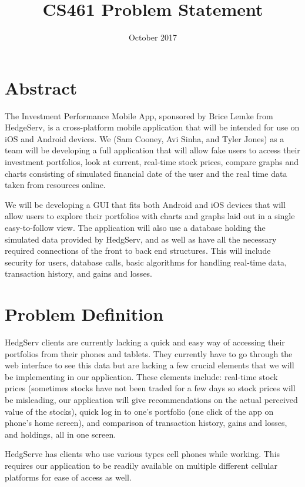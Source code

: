 \documentclass[letterpaper,10pt,titlepage]{article}
\title{CS461 Problem Statement}
\author{\name}
\date{October 2017}
\begin{document}
\begin{titlepage}
   \maketitle
\end{titlepage}

\section{Abstract}

The Investment Performance Mobile App, sponsored by Brice Lemke from HedgeServ,
is a cross-platform mobile application that will be intended for use on
iOS and Android devices. We (Sam Cooney, Avi Sinha, and Tyler Jones) as a 
team will be developing a full application that will allow fake users to
access their investment portfolios, look at current, real-time stock prices,
compare graphs and charts consisting of simulated financial date of the user
and the real time data taken from resources online. 

We will be developing a GUI that fits both Android and iOS devices that will
allow users to explore their portfolios with charts and graphs laid out in a
single easy-to-follow view. The application will also use a database holding the 
simulated data provided by HedgServ, and as well as have all the necessary 
required connections of the front to back end structures. This will include
security for users, database calls, basic algorithms for handling
real-time data, transaction history, and gains and losses.

\section{Problem Definition}

HedgServ clients are currently lacking a quick and easy way of accessing their
portfolios from their phones and tablets. They currently have to go through
the web interface to see this data but are lacking a few crucial elements that
we will be implementing in our application. These elements include: real-time 
stock prices (sometimes stocks have not been traded for a few days so stock 
prices will be misleading, our application will give recommendations on the
actual perceived value of the stocks), quick log in to one's portfolio (one click
of the app on phone's home screen), and comparison of transaction history, gains and losses, and holdings,
all in one screen. 

HedgServe has clients who use various types cell phones while working.
This requires our application to be readily available on multiple different cellular
platforms for ease of access as well. 
\end{document}
